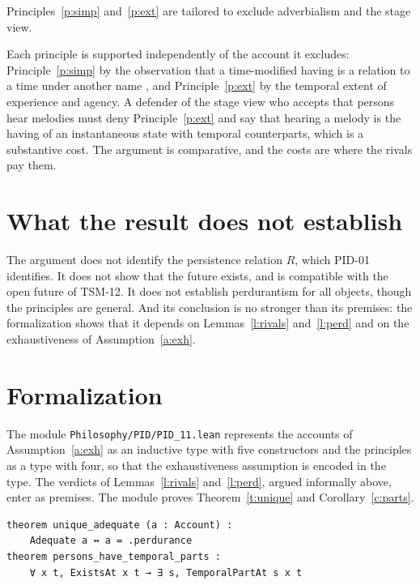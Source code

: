 \documentclass{situationist-preprint}
\begin{document}
\begin{objection}
Principles~\ref{p:simp} and~\ref{p:ext} are tailored to exclude adverbialism and the stage view.
\end{objection}

\begin{reply}
Each principle is supported independently of the account it excludes: Principle~\ref{p:simp} by the observation that a time-modified having is a relation to a time under another name \citep{Lewis2002}, and Principle~\ref{p:ext} by the temporal extent of experience and agency. A defender of the stage view who accepts that persons hear melodies must deny Principle~\ref{p:ext} and say that hearing a melody is the having of an instantaneous state with temporal counterparts, which is a substantive cost. The argument is comparative, and the costs are where the rivals pay them.
\end{reply}

\section{What the result does not establish}\label{s:not}

The argument does not identify the persistence relation $R$, which PID-01 identifies. It does not show that the future exists, and is compatible with the open future of TSM-12. It does not establish perdurantism for all objects, though the principles are general. And its conclusion is no stronger than its premises: the formalization shows that it depends on Lemmas~\ref{l:rivals} and~\ref{l:perd} and on the exhaustiveness of Assumption~\ref{a:exh}.

\section{Formalization}\label{s:formal}

The module \nolinkurl{Philosophy/PID/PID_11.lean} represents the accounts of Assumption~\ref{a:exh} as an inductive type with five constructors and the principles as a type with four, so that the exhaustiveness assumption is encoded in the type. The verdicts of Lemmas~\ref{l:rivals} and~\ref{l:perd}, argued informally above, enter as premises. The module proves Theorem~\ref{t:unique} and Corollary~\ref{c:parts}.

\begin{lstlisting}
theorem unique_adequate (a : Account) :
    Adequate a ↔ a = .perdurance
theorem persons_have_temporal_parts :
    ∀ x t, ExistsAt x t → ∃ s, TemporalPartAt s x t
\end{lstlisting}
\end{document}
